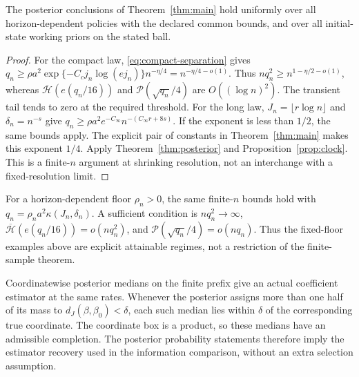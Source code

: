\begin{corollary}
\label{cor:rates}
The posterior conclusions of Theorem~\ref{thm:main} hold uniformly over all
horizon-dependent policies with the declared common bounds, and over all
initial-state working priors on the stated ball.
\end{corollary}
\begin{proof}
For the compact law, \eqref{eq:compact-separation} gives
$q_n\ge\rho a^2\exp\{-C_cj_n\log(ej_n)\}n^{-\eta/4}
=n^{-\eta/4-o(1)}$. Thus $nq_n^2\ge n^{1-\eta/2-o(1)}$, whereas
$\overline{\mathcal H}(e(q_n/16))$ and $\mathcal P(\sqrt{q_n}/4)$ are
$O((\log n)^2)$. The transient tail tends to zero at the required threshold.
For the long law, $J_n=\lfloor r\log n\rfloor$ and $\delta_n=n^{-s}$ give
$q_n\ge\rho a^2e^{-C_\infty}n^{-(C_\infty r+8s)}$. If the exponent is
less than $1/2$, the same bounds apply. The explicit pair of constants in
Theorem~\ref{thm:main} makes this exponent $1/4$. Apply
Theorem~\ref{thm:posterior} and Proposition~\ref{prop:clock}. This is a
finite-$n$ argument at shrinking resolution, not an interchange with a
fixed-resolution limit.
\end{proof}

For a horizon-dependent floor $\rho_n>0$, the same finite-$n$ bounds hold
with $q_n=\rho_n a^2\kappa(J_n,\delta_n)$. A sufficient condition is
$nq_n^2\to\infty$,
$\overline{\mathcal H}(e(q_n/16))=o(nq_n^2)$, and
$\mathcal P(\sqrt{q_n}/4)=o(nq_n)$. Thus the fixed-floor examples above
are explicit attainable regimes, not a restriction of the finite-sample theorem.

Coordinatewise posterior medians on the finite prefix give an actual
coefficient estimator at the same rates. Whenever the posterior assigns more
than one half of its mass to $d_J(\beta,\beta_0)<\delta$, each such median lies
within $\delta$ of the corresponding true coordinate. The coordinate box is
a product, so these medians have an admissible completion. The posterior
probability statements therefore imply the estimator recovery used in the
information comparison, without an extra selection assumption.

